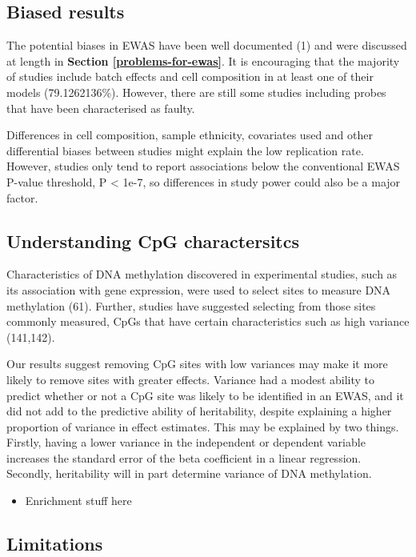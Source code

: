 \documentclass[11pt,oneside]{bristolthesis}
\providecommand{\tightlist}{%
  \setlength{\itemsep}{0pt}\setlength{\parskip}{0pt}}
\begin{document}
\hypertarget{biased-results}{%
\subsection{Biased results}\label{biased-results}}

The potential biases in EWAS have been well documented (1) and were discussed at length in \textbf{Section \ref{problems-for-ewas}}. It is encouraging that the majority of studies include batch effects and cell composition in at least one of their models (79.1262136\%). However, there are still some studies including probes that have been characterised as faulty.

Differences in cell composition, sample ethnicity, covariates used and other differential biases between studies might explain the low replication rate. However, studies only tend to report associations below the conventional EWAS P-value threshold, P \textless{} 1e-7, so differences in study power could also be a major factor.

\hypertarget{understanding-cpg-characteristics}{%
\subsection{Understanding CpG charactersitcs}\label{understanding-cpg-characteristics}}

Characteristics of DNA methylation discovered in experimental studies, such as its association with gene expression, were used to select sites to measure DNA methylation (61). Further, studies have suggested selecting from those sites commonly measured, CpGs that have certain characteristics such as high variance (141,142).

Our results suggest removing CpG sites with low variances may make it more likely to remove sites with greater effects. Variance had a modest ability to predict whether or not a CpG site was likely to be identified in an EWAS, and it did not add to the predictive ability of heritability, despite explaining a higher proportion of variance in effect estimates. This may be explained by two things. Firstly, having a lower variance in the independent or dependent variable increases the standard error of the beta coefficient in a linear regression. Secondly, heritability will in part determine variance of DNA methylation.
\begin{itemize}
\tightlist
\item
  Enrichment stuff here
\end{itemize}
\hypertarget{limitations}{%
\subsection{Limitations}\label{limitations}}
\end{document}
